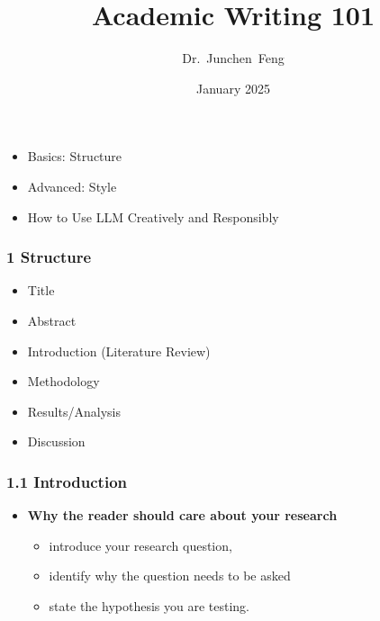 \documentclass{beamer}
\title{Academic Writing 101}
\author{Dr.~Junchen~Feng}
\date{January 2025}
\begin{document}
\maketitle

\begin{frame}
    \begin{itemize}
        \item Basics: Structure
        \item Advanced: Style
        \item How to Use LLM Creatively and Responsibly
    \end{itemize}
\end{frame}


\begin{frame}
  \frametitle{1 Structure}
  \begin{itemize}
      \item Title
      \item Abstract
      \item Introduction (Literature Review)
      \item Methodology
      \item Results/Analysis
      \item Discussion
  \end{itemize}
  \end{frame}
      
  
  \begin{frame}
      \frametitle{1.1 Introduction}
      \begin{itemize}
          \item \textbf{Why the reader should care about your research}
          \begin{itemize}
              \item introduce your research question,
              \item identify why the question needs to be asked 
              \item state the hypothesis you are testing.
          \end{itemize}
      \end{itemize}
      \end{frame}
      
\end{document}
